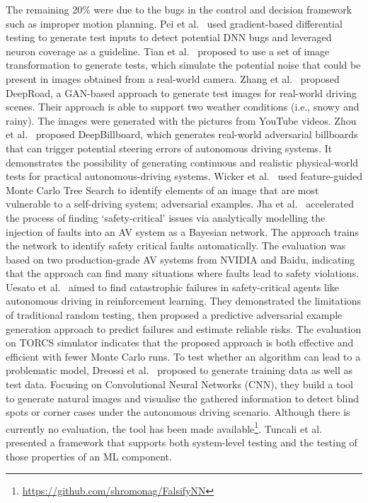 The remaining 20\% were due to the bugs in the control and decision framework such as improper motion planning.
Pei et al.~ used gradient-based differential testing to generate test inputs to detect potential DNN bugs and leveraged neuron coverage as a guideline.
Tian et al.~ proposed to use a set of image transformation to generate tests, which simulate the potential noise that could be present in images obtained from a real-world camera.
Zhang et al.~ proposed DeepRoad, a GAN-based approach to generate test images for real-world driving scenes. Their approach is able to support two weather conditions (i.e., snowy and rainy).
The images were generated with the pictures from YouTube videos.
Zhou et al.~ proposed DeepBillboard, which generates real-world adversarial billboards that can trigger potential steering errors of autonomous driving systems. 
It demonstrates the possibility of generating continuous and realistic physical-world tests for practical autonomous-driving systems.
Wicker et al.~ used feature-guided Monte Carlo Tree Search to identify elements of an image that are most vulnerable to a self-driving system; adversarial examples.
Jha et al.~ accelerated the process of finding `safety-critical' issues via analytically modelling the injection of faults into an AV system as a Bayesian network.
The approach trains the network to identify safety critical faults automatically. 
The evaluation was based on two production-grade AV systems from NVIDIA and Baidu, indicating that the approach can find many situations where faults lead to safety violations. 
Uesato et al.~ aimed to find catastrophic failures in safety-critical agents like autonomous driving in reinforcement learning. 
They demonstrated the limitations of traditional random testing, then proposed a predictive adversarial example generation approach to predict failures and estimate reliable risks.
The evaluation on TORCS simulator indicates that the proposed approach is both effective and efficient with fewer Monte Carlo runs.
To test whether an algorithm can lead to a problematic model, Dreossi et al.~ proposed to generate training data as well as test data.
Focusing on Convolutional Neural Networks (CNN), they build a tool to generate natural images and visualise the gathered information to detect blind spots or corner cases under the autonomous driving scenario. 
Although there is currently no evaluation, the tool has been made available\footnote{\url{https://github.com/shromonag/FalsifyNN}}.
Tuncali et al.~ presented a framework that supports both system-level testing and the testing of those properties of an ML component.
